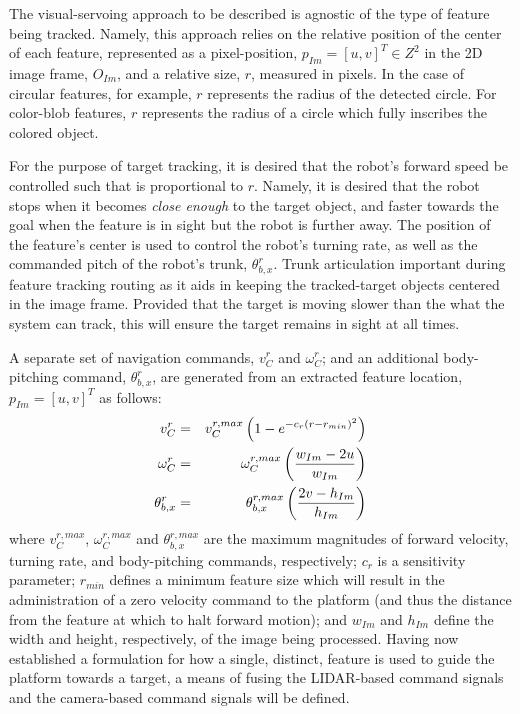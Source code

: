 			The visual-servoing approach to be described is agnostic of the type of feature being tracked. Namely, this approach relies on the relative position of the center of each feature, represented as a pixel-position, $p_{Im} = [u,v]^{T} \in Z^{2}$ in the 2D image frame, $O_{Im}$, and a relative size, $r$, measured in pixels. In the case of circular features, for example, $r$ represents the radius of the detected circle. For color-blob features, $r$ represents the radius of a circle which fully inscribes the colored object.

			For the purpose of target tracking, it is desired that the robot's forward speed be controlled such that is proportional to $r$. Namely, it is desired that the robot stops when it becomes \emph{close enough} to the target object, and faster towards the goal when the feature is in sight but the robot is further away. The position of the feature's center is used to control the robot's turning rate, as well as the commanded pitch of the robot's trunk, $\theta_{b,x}^{r}$. Trunk articulation important during feature tracking routing as it aids in keeping the tracked-target objects centered in the image frame. Provided that the target is moving slower than the what the system can track, this will ensure the target remains in sight at all times.

			A separate set of navigation commands, $v_{C}^{r}$ and $\omega_{C}^{r}$; and an additional body-pitching command, $\theta_{b,x}^{r}$,  are generated from an extracted feature location, $p_{Im} = [u,v]^{T}$ as follows: 
				\begin{eqnarray}
					v_{C}^{r} 			& = & v_{C}^{r,max} \left( 1 - e^{ -c_{r} \left( r-r_{min} \right)^{2} } \right) 	\nonumber 	\\
					\omega_{C}^{r} 	& = & \omega_{C}^{r,max} \left(\frac{ w_{Im} - 2 u  }{ w_{Im} } \right)		\nonumber 	\\
					\theta_{b,x}^{r}	& = & \theta_{b,x}^{r,max} \left( \frac{ 2 v - h_{Im} }{ h_{Im} } \right) 		
				\end{eqnarray}
			where $v_{C}^{r,max}$, $\omega_{C}^{r,max}$ and $\theta_{b,x}^{r,max}$ are the maximum magnitudes of forward velocity, turning rate, and body-pitching commands, respectively; $c_{r}$ is a sensitivity parameter; $r_{min}$ defines a minimum feature size which will result in the administration of a zero velocity command to the platform (and thus the distance from the feature at which to halt forward motion); and $w_{Im}$ and $h_{Im}$ define the width and height, respectively, of the image being processed. Having now established a formulation for how a single, distinct, feature is used to guide the platform towards a target, a means of fusing the LIDAR-based command signals and the camera-based command signals will be defined.

